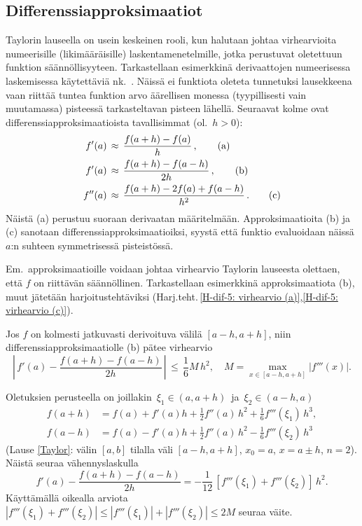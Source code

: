 \subsection{Differenssiapproksimaatiot}

Taylorin lauseella on usein keskeinen rooli, kun halutaan johtaa virhearvioita numeerisille
(likimääräisille) laskentamenetelmille, jotka perustuvat oletettuun funktion säännöllisyyteen.
Tarkastellaan esimerkkinä derivaattojen numeerisessa laskemisessa käytettäviä nk.\
. Näissä ei funktiota oleteta tunnetuksi lausekkeena vaan
riittää tuntea funktion arvo äärellisen monessa (tyypillisesti vain muutamassa) pisteessä
tarkasteltavan pisteen lähellä. Seuraavat kolme ovat differenssiapproksimaatioista
tavallisimmat (ol.\ $h>0$):
\begin{align}
f'(a)  &\,\approx\, \frac{f(a+h)-f(a)}{h}\,, \label{dif1} \tag{\text{a}} \\
f'(a)  &\,\approx\, \frac{f(a+h)-f(a-h)}{2h}\,, \label{dif2} \tag{\text{b}} \\
f''(a) &\,\approx\, \frac{f(a+h)-2f(a)+f(a-h)}{h^2}\,. \label{dif3} \tag{\text{c}}
\end{align}
Näistä (a) perustuu suoraan derivaatan määritelmään. Approksimaatioita (b) ja (c) sanotaan 
\index{keskeisdifferenssiapproksimaatio}%
differenssiapproksimaatioiksi, syystä että funktio evaluoidaan näissä $a$:n
suhteen symmetrisessä pisteistössä.

Em.\ approksimaatioille voidaan johtaa virhearvio Taylorin lauseesta olettaen, että $f$ on
riittävän säännöllinen. Tarkastellaan esimerkkinä approksimaatiota (b), muut jätetään
harjoitustehtäviksi (Harj.teht.\,\ref{H-dif-5: virhearvio (a)},\ref{H-dif-5: virhearvio (c)}).
\begin{Prop} \label{keskeisdifferenssin tarkkuus} Jos $f$ on kolmesti jatkuvasti derivoituva
välilä $[a-h,a+h]$, niin differenssiapproksimaatiolle (b) pätee virhearvio
\[
\left|\,f'(a)-\frac{f(a+h)-f(a-h)}{2h}\,\right| \,\le\,\frac{1}{6}M\,h^2, \quad
                                          M=\max_{x\in[a-h,a+h]}|f'''(x)|.
\]
\end{Prop}
\tod Oletuksien perusteella on joillakin $\,\xi_1\in(a,a+h)\,$ ja $\,\xi_2\in(a-h,a)$ 
\begin{align*}
f(a+h) &= f(a)+f'(a)h+\frac{1}{2}f''(a)\,h^2+\frac{1}{6}f'''(\xi_1)\,h^3, \\
f(a-h) &= f(a)-f'(a)h+\frac{1}{2}f''(a)\,h^2-\frac{1}{6}f'''(\xi_2)\,h^3
\end{align*}
(Lause \ref{Taylor}: välin $[a,b]$ tilalla väli $[a-h,a+h]$, $x_0=a$, $x=a \pm h$, $n=2$).
Näistä seuraa vähennyslaskulla
\[
f'(a)-\frac{f(a+h)-f(a-h)}{2h} = -\frac{1}{12}\,[f'''(\xi_1)+f'''(\xi_2)]\,h^2.
\]
Käyttämällä oikealla arviota $|f'''(\xi_1)+f'''(\xi_2)| \le |f'''(\xi_1)|+|f'''(\xi_2)| \le 2M$
seuraa väite. \loppu

